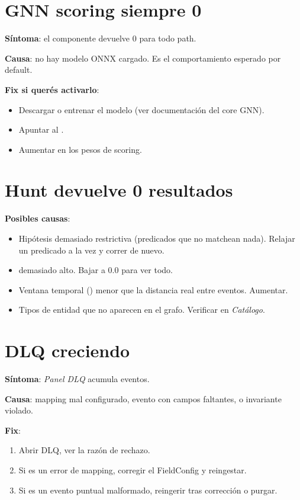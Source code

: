 \section{GNN scoring siempre 0}

\textbf{Síntoma}: el componente  devuelve 0 para
todo path.

\textbf{Causa}: no hay modelo ONNX cargado. Es el comportamiento
esperado por default.

\textbf{Fix si querés activarlo}:

\begin{itemize}
    \item Descargar o entrenar el modelo (ver documentación del
    core GNN).
    \item Apuntar  al .
    \item Aumentar  en los pesos de
    scoring.
\end{itemize}

\section{Hunt devuelve 0 resultados}

\textbf{Posibles causas}:

\begin{itemize}
    \item Hipótesis demasiado restrictiva (predicados que no
    matchean nada). Relajar un predicado a la vez y correr de
    nuevo.
    \item {} demasiado alto. Bajar a 0.0 para ver
    todo.
    \item Ventana temporal () menor que la distancia
    real entre eventos. Aumentar.
    \item Tipos de entidad que no aparecen en el grafo. Verificar
    en \emph{Catálogo}.
\end{itemize}

\section{DLQ creciendo}

\textbf{Síntoma}: \emph{Panel \textrightarrow{} DLQ} acumula
eventos.

\textbf{Causa}: mapping mal configurado, evento con campos
faltantes, o invariante violado.

\textbf{Fix}:

\begin{enumerate}
    \item Abrir DLQ, ver la razón de rechazo.
    \item Si es un error de mapping, corregir el FieldConfig y
    reingestar.
    \item Si es un evento puntual malformado, reingerir tras
    corrección o purgar.
\end{enumerate}

